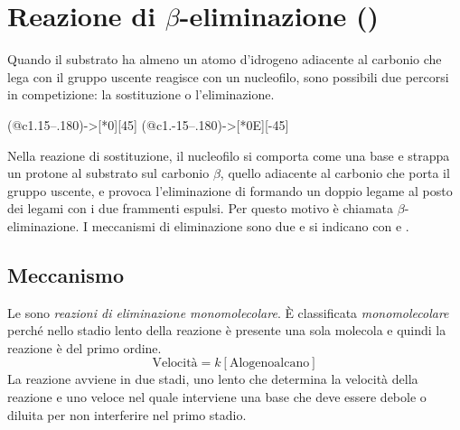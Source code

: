 \section{Reazione di \texorpdfstring{\(\beta\)}{β}-eliminazione (\texorpdfstring{\mech[e]}{E})}
Quando il substrato ha almeno un atomo d'idrogeno adiacente al carbonio che lega con il gruppo uscente reagisce con un nucleofilo, sono possibili due percorsi in competizione: la sostituzione o l'eliminazione.

\begin{reaction}
	 \+
	\arrow(@c1.15--.180){->[*{0}\mech]}[45]
	 \+
	\arrow(@c1.-15--.180){->[*{0}E]}[-45]
	 \+
	 \+ 
\end{reaction}

Nella reazione di sostituzione, il nucleofilo si comporta come una base e strappa un protone al substrato sul carbonio \(\beta\), quello adiacente al carbonio che porta il gruppo uscente, e provoca l'eliminazione di  formando un doppio legame al posto dei legami con i due frammenti espulsi. Per questo motivo è chiamata \(\beta\)-eliminazione. I meccanismi di eliminazione sono due e si indicano con \mech[e1] e \mech[e2].


\subsection{Meccanismo \texorpdfstring{\mech[e1]}{E1}}
Le \mech[e1] sono \textit{reazioni di eliminazione monomolecolare}. È classificata \textit{monomolecolare} perché nello stadio lento della reazione è presente una sola molecola e quindi la reazione è del primo ordine.
\begin{equation*}
	\text{Velocità} = k\left[\text{Alogenoalcano}\right]
\end{equation*}
La reazione avviene in due stadi, uno lento che determina la velocità della reazione e uno veloce nel quale interviene una base che deve essere debole o diluita per non interferire nel primo stadio.

